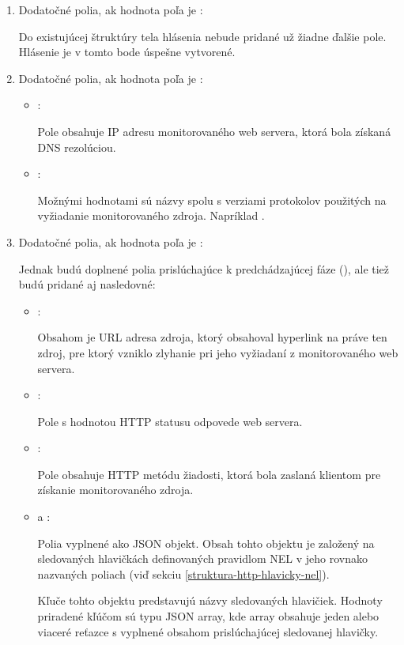 \begin{enumerate}
    \item Dodatočné polia, ak hodnota poľa  je :

    Do existujúcej štruktúry tela hlásenia nebude pridané už žiadne ďalšie pole.
    Hlásenie je v tomto bode úspešne vytvorené.
    
    \item Dodatočné polia, ak hodnota poľa  je :
    \begin{itemize}
        \item {}:
    
        Pole obsahuje IP adresu monitorovaného web servera, ktorá bola získaná DNS rezolúciou.
        
        \item {}:
    
        Možnými hodnotami sú názvy spolu s verziami protokolov použitých na vyžiadanie monitorovaného zdroja.
        Napríklad .
    \end{itemize}
    
    \item Dodatočné polia, ak hodnota poľa  je :

    Jednak budú doplnené polia prislúchajúce k predchádzajúcej fáze (), ale tiež budú pridané aj nasledovné:
    \begin{itemize}
        \item {}:

        Obsahom je URL adresa zdroja, ktorý obsahoval hyperlink na práve ten zdroj, pre ktorý vzniklo zlyhanie pri jeho vyžiadaní z monitorovaného web servera.

        \item {}:

        Pole s hodnotou HTTP statusu odpovede web servera.

        \item {}:

        Pole obsahuje HTTP metódu žiadosti, ktorá bola zaslaná klientom pre získanie monitorovaného zdroja.
        
        \item {} a :
    
        Polia vyplnené ako JSON objekt. 
        Obsah tohto objektu je založený na sledovaných hlavičkách definovaných pravidlom NEL v jeho rovnako nazvaných poliach (viď sekciu \ref{struktura-http-hlavicky-nel}).
        
        Kľuče tohto objektu predstavujú názvy sledovaných hlavičiek.
        Hodnoty priradené kľúčom sú typu JSON array, kde array obsahuje jeden alebo viaceré reťazce s vyplnené obsahom prislúchajúcej sledovanej hlavičky.
        
    \end{itemize}    
\end{enumerate}


